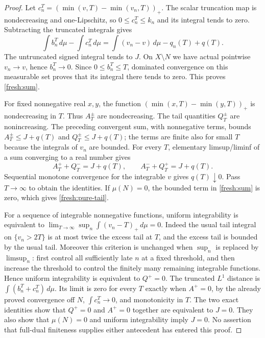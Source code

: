 \documentclass[11pt]{article}
\begin{document}
\begin{proof}
Let $c_n^T=(\min(v,T)-\min(v_n,T))_+$. The scalar truncation map is
nondecreasing and one-Lipschitz, so $0\le c_n^T\le k_n$ and its
integral tends to zero. Subtracting the truncated integrals gives
\[
 \int b_n^T\,d\mu-\int c_n^T\,d\mu
 =\int(v_n-v)\,d\mu-q_n(T)+q(T).
\]
The untruncated signed integral tends to $J$. On $X\setminus N$ we
have actual pointwise $v_n\to v$, hence $b_n^T\to0$. Since
$0\le b_n^T\le T$, dominated convergence on this measurable set
proves that its integral there tends to zero. This proves
\eqref{fresh:sum}.

For fixed nonnegative real $x,y$, the function
$(\min(x,T)-\min(y,T))_+$ is nondecreasing in $T$. Thus $A_T^\pm$
are nondecreasing. The tail quantities $Q_T^\pm$ are nonincreasing.
The preceding convergent sum, with nonnegative terms, bounds
$A_T^\pm\le J+q(T)$ and $Q_T^\pm\le J+q(T)$; the terms are finite
also for small $T$ because the integrals of $v_n$ are bounded.
For every $T$, elementary limsup/liminf of a sum converging to a real
number gives
\[
 A_T^++Q_T^-=J+q(T),\qquad A_T^-+Q_T^+=J+q(T).
\]
Sequential monotone convergence for the integrable $v$ gives
$q(T)\downarrow0$. Pass $T\to\infty$ to obtain the identities.
If $\mu(N)=0$, the bounded term in \eqref{fresh:sum} is zero, which
gives \eqref{fresh:pure-tail}.

For a sequence of integrable nonnegative functions, uniform
integrability is equivalent to
$\lim_{T\to\infty}\sup_n\int(v_n-T)_+\,d\mu=0$.
Indeed the usual tail integral on $\{v_n>2T\}$ is at most twice the
excess tail at $T$, and the excess tail is bounded by the usual tail.
Moreover this criterion is unchanged when $\sup_n$ is replaced by
$\limsup_n$: first control all sufficiently late $n$ at a fixed
threshold, and then increase the threshold to control the finitely
many remaining integrable functions. Hence uniform integrability is
equivalent to $Q^+=0$.
The truncated $L^1$ distance is
$\int(b_n^T+c_n^T)\,d\mu$. Its limit is zero for every $T$ exactly
when $A^+=0$, by the already proved convergence off $N$,
$\int c_n^T\to0$, and monotonicity in $T$. The two exact identities
show that $Q^+=0$ and $A^+=0$ together are equivalent to $J=0$.
They also show that $\mu(N)=0$ and uniform integrability imply $J=0$.
No assertion that full-dual finiteness supplies either antecedent has
entered this proof.
\end{proof}
\end{document}
